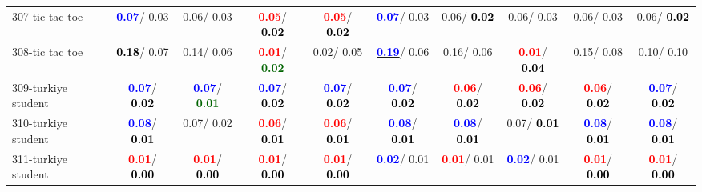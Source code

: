\begin{table}[h]
\begin{center}
{\begin{tabular}{lc|c|c|c|c|c|c|c|c}
307-tic tac toe & \textcolor{blue}{\textbf{  0.07}}/  0.03 &   0.06/  0.03 & \textcolor{red}{\textbf{  0.05}}/\textcolor{black}{\textbf{  0.02}} & \textcolor{red}{\textbf{  0.05}}/\textcolor{black}{\textbf{  0.02}} & \textcolor{blue}{\textbf{  0.07}}/  0.03 &   0.06/\textcolor{black}{\textbf{  0.02}} &   0.06/  0.03 &   0.06/  0.03 &   0.06/\textcolor{black}{\textbf{  0.02}} \\
308-tic tac toe & \textcolor{black}{\textbf{  0.18}}/  0.07 &   0.14/  0.06 & \textcolor{red}{\textbf{  0.01}}/\textcolor{darkgreen}{\textbf{  0.02}} &   0.02/  0.05 & \underline{\textcolor{blue}{\textbf{  0.19}}}/  0.06 &   0.16/  0.06 & \textcolor{red}{\textbf{  0.01}}/\textcolor{black}{\textbf{  0.04}} &   0.15/  0.08 &   0.10/  0.10 \\
309-turkiye student & \textcolor{blue}{\textbf{  0.07}}/\textcolor{black}{\textbf{  0.02}} & \textcolor{blue}{\textbf{  0.07}}/\textcolor{darkgreen}{\textbf{  0.01}} & \textcolor{blue}{\textbf{  0.07}}/\textcolor{black}{\textbf{  0.02}} & \textcolor{blue}{\textbf{  0.07}}/\textcolor{black}{\textbf{  0.02}} & \textcolor{blue}{\textbf{  0.07}}/\textcolor{black}{\textbf{  0.02}} & \textcolor{red}{\textbf{  0.06}}/\textcolor{black}{\textbf{  0.02}} & \textcolor{red}{\textbf{  0.06}}/\textcolor{black}{\textbf{  0.02}} & \textcolor{red}{\textbf{  0.06}}/\textcolor{black}{\textbf{  0.02}} & \textcolor{blue}{\textbf{  0.07}}/\textcolor{black}{\textbf{  0.02}} \\ \hline
310-turkiye student & \textcolor{blue}{\textbf{  0.08}}/\textcolor{black}{\textbf{  0.01}} &   0.07/  0.02 & \textcolor{red}{\textbf{  0.06}}/\textcolor{black}{\textbf{  0.01}} & \textcolor{red}{\textbf{  0.06}}/\textcolor{black}{\textbf{  0.01}} & \textcolor{blue}{\textbf{  0.08}}/\textcolor{black}{\textbf{  0.01}} & \textcolor{blue}{\textbf{  0.08}}/\textcolor{black}{\textbf{  0.01}} &   0.07/\textcolor{black}{\textbf{  0.01}} & \textcolor{blue}{\textbf{  0.08}}/\textcolor{black}{\textbf{  0.01}} & \textcolor{blue}{\textbf{  0.08}}/\textcolor{black}{\textbf{  0.01}} \\
311-turkiye student & \textcolor{red}{\textbf{  0.01}}/\textcolor{black}{\textbf{  0.00}} & \textcolor{red}{\textbf{  0.01}}/\textcolor{black}{\textbf{  0.00}} & \textcolor{red}{\textbf{  0.01}}/\textcolor{black}{\textbf{  0.00}} & \textcolor{red}{\textbf{  0.01}}/\textcolor{black}{\textbf{  0.00}} & \textcolor{blue}{\textbf{  0.02}}/  0.01 & \textcolor{red}{\textbf{  0.01}}/  0.01 & \textcolor{blue}{\textbf{  0.02}}/  0.01 & \textcolor{red}{\textbf{  0.01}}/\textcolor{black}{\textbf{  0.00}} & \textcolor{red}{\textbf{  0.01}}/\textcolor{black}{\textbf{  0.00}} \\

\end{tabular}}
\end{center}
\end{table}
